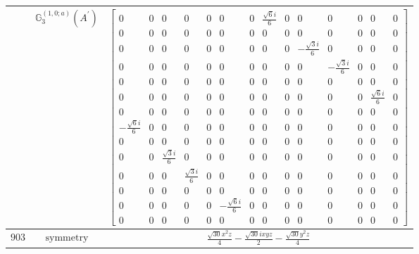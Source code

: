 \documentclass[fleqn,8pt,landscape]{jsarticle}
\begin{document}
\begin{longtable}{ccc}
$  $ & $ \mathbb{G}_{3}^{(1,0;a)}(A^{\prime}) $ & $ \begin{bmatrix} 0 & 0 & 0 & 0 & 0 & 0 & 0 & \frac{\sqrt{6} i}{6} & 0 & 0 & 0 & 0 & 0 & 0 \\ 0 & 0 & 0 & 0 & 0 & 0 & 0 & 0 & 0 & 0 & 0 & 0 & 0 & 0 \\ 0 & 0 & 0 & 0 & 0 & 0 & 0 & 0 & 0 & - \frac{\sqrt{3} i}{6} & 0 & 0 & 0 & 0 \\ 0 & 0 & 0 & 0 & 0 & 0 & 0 & 0 & 0 & 0 & - \frac{\sqrt{3} i}{6} & 0 & 0 & 0 \\ 0 & 0 & 0 & 0 & 0 & 0 & 0 & 0 & 0 & 0 & 0 & 0 & 0 & 0 \\ 0 & 0 & 0 & 0 & 0 & 0 & 0 & 0 & 0 & 0 & 0 & 0 & \frac{\sqrt{6} i}{6} & 0 \\ 0 & 0 & 0 & 0 & 0 & 0 & 0 & 0 & 0 & 0 & 0 & 0 & 0 & 0 \\ - \frac{\sqrt{6} i}{6} & 0 & 0 & 0 & 0 & 0 & 0 & 0 & 0 & 0 & 0 & 0 & 0 & 0 \\ 0 & 0 & 0 & 0 & 0 & 0 & 0 & 0 & 0 & 0 & 0 & 0 & 0 & 0 \\ 0 & 0 & \frac{\sqrt{3} i}{6} & 0 & 0 & 0 & 0 & 0 & 0 & 0 & 0 & 0 & 0 & 0 \\ 0 & 0 & 0 & \frac{\sqrt{3} i}{6} & 0 & 0 & 0 & 0 & 0 & 0 & 0 & 0 & 0 & 0 \\ 0 & 0 & 0 & 0 & 0 & 0 & 0 & 0 & 0 & 0 & 0 & 0 & 0 & 0 \\ 0 & 0 & 0 & 0 & 0 & - \frac{\sqrt{6} i}{6} & 0 & 0 & 0 & 0 & 0 & 0 & 0 & 0 \\ 0 & 0 & 0 & 0 & 0 & 0 & 0 & 0 & 0 & 0 & 0 & 0 & 0 & 0 \end{bmatrix} $ \\ \hline
$ 903 $ & $ \text{symmetry} $ & $ \frac{\sqrt{30} x^{2} z}{4} - \frac{\sqrt{30} i x y z}{2} - \frac{\sqrt{30} y^{2} z}{4} $ \\

\end{longtable}
\end{document}
